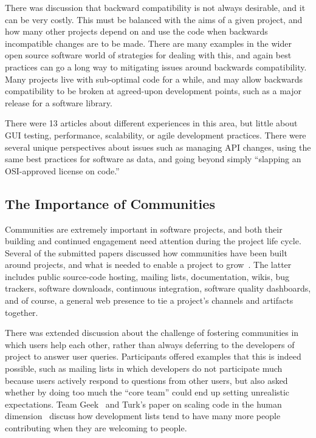 \documentclass[11pt, oneside]{amsart}
\begin{document}
There was discussion that backward compatibility is not always
desirable, and it can be very costly. This must be balanced with the
aims of a given project, and how many other projects depend on and use
the code when backwards incompatible changes are to be made. There are
many examples in the wider open source software world of strategies
for dealing with this, and again best practices can go a long way to
mitigating issues around backwards compatibility. Many projects live
with sub-optimal code for a while, and may allow backwards
compatibility to be broken at agreed-upon development points, such as
a major release for a software library.

There were 13 articles about different experiences in this area, but
little about GUI testing, performance, scalability, or agile
development practices.  There were several unique perspectives about
issues such as managing API changes, using the same best practices for
software as data, and going beyond simply ``slapping an OSI-approved
license on code.''

\subsection{The Importance of Communities}

Communities are extremely important in software projects, and both
their building and continued engagement need attention during the
project life cycle.  Several of the submitted papers 
discussed how communities have been built around projects, and what is
needed to enable a project to grow~\cite{Crusoe_WSSSPE, Hanwell_WSSSPE, Christopherson_WSSSPE, Cranston_WSSSPE, Terrel_WSSSPE}. The latter includes public
source-code hosting, mailing lists, documentation, wikis, bug
trackers, software downloads, continuous integration, software quality
dashboards, and of course, a general web presence to tie a project's
channels and artifacts together.

There was extended discussion about the challenge of fostering
communities in which users help each other, rather than always
deferring to the developers of project to answer user
queries. Participants offered examples that this is indeed possible,
such as mailing lists in which developers do not participate much
because users actively respond to questions from other users, but also
asked whether by doing too much the ``core team'' could end up setting
unrealistic expectations. Team Geek~\cite{opac-b1134063} and Turk's
paper on scaling code in the human
dimension~\cite{Turk:2013:SCH:2484762.2484782} discuss how development
lists tend to have many more people contributing when they are
welcoming to people.
\end{document}
